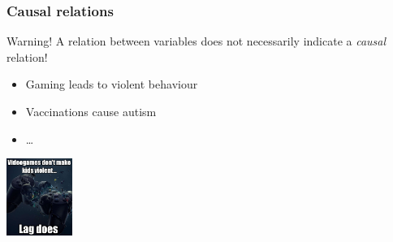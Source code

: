 \documentclass{beamer}
\begin{document}
\begin{frame}
  \frametitle{Causal relations}

  \begin{alertblock}{Warning!}
      A relation between variables does not necessarily indicate a \emph{causal} relation!
  \end{alertblock}

  \begin{itemize}
    \item Gaming leads to violent behaviour
    \item Vaccinations cause autism
    \item \ldots
  \end{itemize}

  \begin{center}
    \includegraphics[height=2.5cm]{img/les1-10}
  \end{center}
\end{frame}
\end{document}
